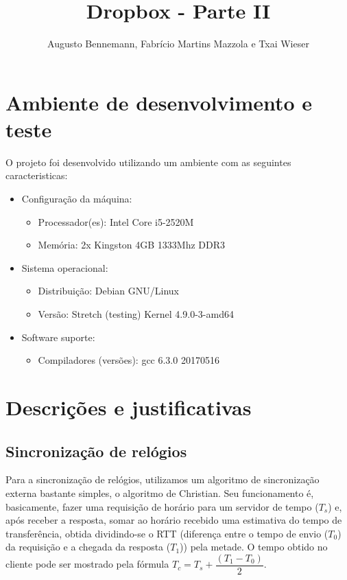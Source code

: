 \documentclass[a4paper]{article}
\title{Dropbox - Parte II}
\author{Augusto Bennemann, Fabrício Martins Mazzola e Txai Wieser}
\date{}
\begin{document}
\maketitle


\section{Ambiente de desenvolvimento e teste}

O projeto foi desenvolvido utilizando um ambiente com as seguintes caracteristicas:
\begin{itemize}
	\item Configuração da máquina:
	\begin{itemize}
		\item Processador(es): Intel Core i5-2520M
		\item Memória: 2x Kingston 4GB 1333Mhz DDR3
	\end{itemize}

	\item{Sistema operacional}: 
	\begin{itemize}
		\item Distribuição: Debian GNU/Linux 
		\item Versão: Stretch (testing) Kernel 4.9.0-3-amd64
	\end{itemize}

	\item Software suporte:
	\begin{itemize}
		\item Compiladores (versões): gcc 6.3.0 20170516
	\end{itemize}
\end{itemize}

\section{Descrições e justificativas}

\subsection{Sincronização de relógios}
Para a sincronização de relógios, utilizamos um algoritmo de sincronização externa bastante simples, o algoritmo de Christian. Seu funcionamento é, basicamente, fazer uma requisição de horário para um servidor de tempo ($T_s$) e, após receber a resposta, somar ao horário recebido uma estimativa do tempo de transferência, obtida dividindo-se o RTT (diferença entre o tempo de envio ($T_0$) da requisição e a chegada da resposta ($T_1$)) pela metade. O tempo obtido no cliente pode ser mostrado pela fórmula $T_c = T_s + \dfrac{(T_1 - T_0)}{2}$. 
\end{document}
